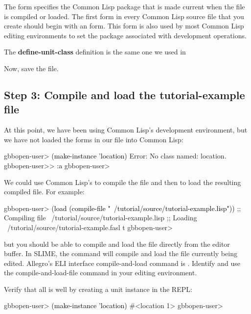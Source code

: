 \documentclass[10pt,twoside,english,pdftex]{article}
\begin{document}
The  form specifies the Common Lisp package that is made
current when the file is compiled or loaded.  The first form in every Common
Lisp source file that you create should begin with an  form.
This form is also used by most Common Lisp editing environments to set the
package associated with development operations.

The \textbf{define-unit-class} definition is the same one we used in

Now, save the file.  

\subsection*{Step 3: Compile and load the tutorial-example file}

At this point, we have been using Common Lisp's
development environment, but we have not loaded the forms in our file
into Common Lisp:
%
\W\supp
\begin{example}
\textcolor{darkergray}{%
  gbbopen-user> \textcolor{black}{(make-instance 'location)}
  Error: No class named: location.
  gbbopen-user>> \textcolor{black}{:a}
  gbbopen-user>}
\end{example}

We could use Common Lisp's  to compile the file and
then  to load the resulting compiled file. For example:
%
\W\supp
\begin{example}
\textcolor{darkergray}{%
  gbbopen-user> \textcolor{black}{(load (compile-file "~/tutorial/source/tutorial-example.lisp"))}
  ;; Compiling file ~/tutorial/source/tutorial-example.lisp
  ;; Loading ~/tutorial/source/tutorial-example.fasl
  t
  gbbopen-user>}
\end{example}
%
but you should be able to compile and load the file directly from the
editor buffer.  In SLIME, the command  will compile and
load the file currently being edited.  Allegro's ELI interface
compile-and-load command is .  Identify and use the
compile-and-load-file command in your editing environment.

Verify that all is well by creating a  unit instance in
the REPL:
%
\W\supp
\begin{example}
\textcolor{darkergray}{%
  gbbopen-user> \textcolor{black}{(make-instance 'location)}
  #<location 1>
  gbbopen-user>}
\end{example}
\end{document}
